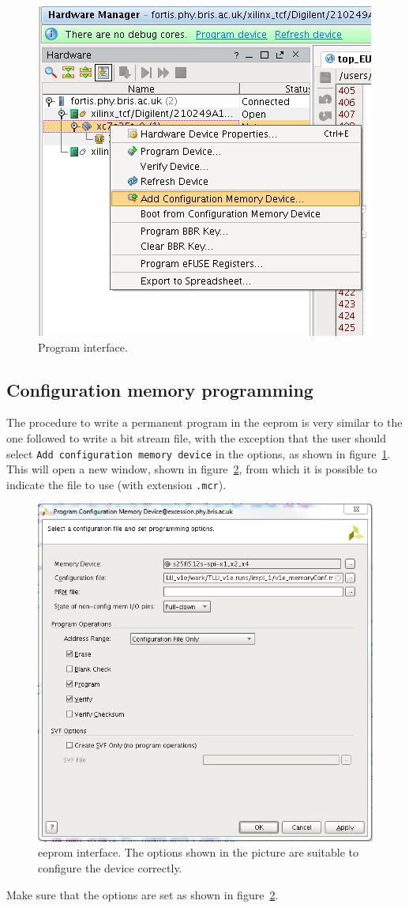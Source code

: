 \begin{figure}
  \centering
  \includegraphics[width=.80\textwidth]{./Images/AddMemory.png}
  \caption{Program interface.}\label{fig:hw_addMemory}
\end{figure}

\subsection{Configuration memory programming}
The procedure to write a permanent program in the \gls{eeprom} is very similar to the one followed to write a bit stream file, with the exception that the user should select \verb"Add configuration memory device" in the options, as shown in figure~\ref{fig:hw_addMemory}.
This will open a new window, shown in figure~\ref{fig:hw_eeprom}, from which it is possible to indicate the file to use (with extension \verb".mcr").
\begin{figure}
  \centering
  \includegraphics[width=.80\textwidth]{./Images/hw_prog.png}
  \caption{\gls{eeprom} interface. The options shown in the picture are suitable to configure the device correctly.}
  \label{fig:hw_eeprom}
\end{figure}
Make sure that the options are set as shown in figure~\ref{fig:hw_eeprom}.

